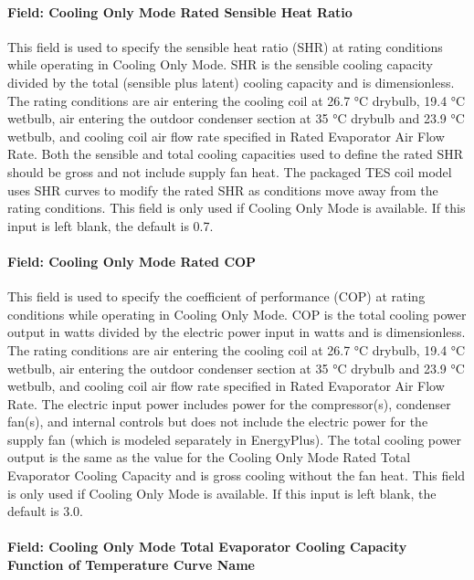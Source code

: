 \paragraph{Field: Cooling Only Mode Rated Sensible Heat Ratio}\label{field-cooling-only-mode-rated-sensible-heat-ratio}

This field is used to specify the sensible heat ratio (SHR) at rating conditions while operating in Cooling Only Mode. SHR is the sensible cooling capacity divided by the total (sensible plus latent) cooling capacity and is dimensionless. The rating conditions are air entering the cooling coil at 26.7 °C drybulb, 19.4 °C wetbulb, air entering the outdoor condenser section at 35 °C drybulb and 23.9 °C wetbulb, and cooling coil air flow rate specified in Rated Evaporator Air Flow Rate. Both the sensible and total cooling capacities used to define the rated SHR should be gross and not include supply fan heat. The packaged TES coil model uses SHR curves to modify the rated SHR as conditions move away from the rating conditions. This field is only used if Cooling Only Mode is available. If this input is left blank, the default is 0.7.

\paragraph{Field: Cooling Only Mode Rated COP}\label{field-cooling-only-mode-rated-cop}

This field is used to specify the coefficient of performance (COP) at rating conditions while operating in Cooling Only Mode. COP is the total cooling power output in watts divided by the electric power input in watts and is dimensionless. The rating conditions are air entering the cooling coil at 26.7 °C drybulb, 19.4 °C wetbulb, air entering the outdoor condenser section at 35 °C drybulb and 23.9 °C wetbulb, and cooling coil air flow rate specified in Rated Evaporator Air Flow Rate. The electric input power includes power for the compressor(s), condenser fan(s), and internal controls but does not include the electric power for the supply fan (which is modeled separately in EnergyPlus). The total cooling power output is the same as the value for the Cooling Only Mode Rated Total Evaporator Cooling Capacity and is gross cooling without the fan heat. This field is only used if Cooling Only Mode is available. If this input is left blank, the default is 3.0.

\paragraph{Field: Cooling Only Mode Total Evaporator Cooling Capacity Function of Temperature Curve Name}\label{field-cooling-only-mode-total-evaporator-cooling-capacity-function-of-temperature-curve-name}

